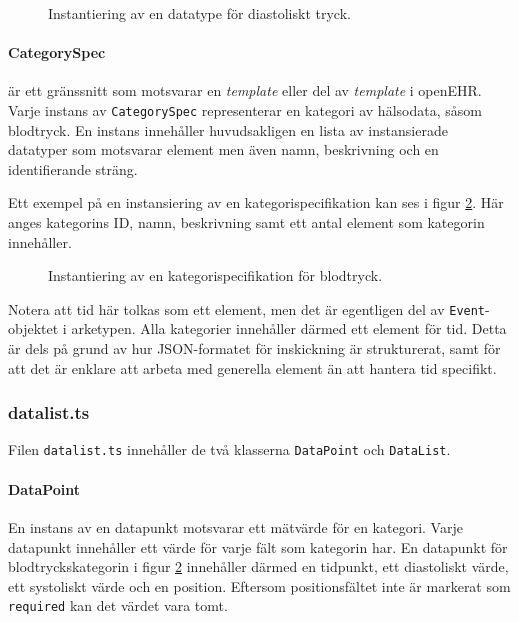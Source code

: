 \documentclass[techdoc/techdoc.tex]{subfiles}
\begin{document}
\begin{figure}[H]
    
    \caption{Instantiering av en datatype för diastoliskt tryck.}
    \label{fig:dt_diastolic}
\end{figure}

\paragraph{CategorySpec} är ett gränssnitt som motsvarar en \textit{template}
eller del av \textit{template} i openEHR. Varje instans av \texttt{CategorySpec}
representerar en kategori av hälsodata, såsom blodtryck. En instans innehåller
huvudsakligen en lista av instansierade datatyper som motsvarar element men även
namn, beskrivning och en identifierande sträng.

Ett exempel på en instansiering av en kategorispecifikation kan ses i figur
\ref{fig:spec_bp}. Här anges kategorins ID, namn, beskrivning samt ett antal
element som kategorin innehåller.

\begin{figure}[H]
    
    \caption{Instantiering av en kategorispecifikation för blodtryck.}
    \label{fig:spec_bp}
\end{figure}

Notera att tid här tolkas som ett element, men det är egentligen del av
\texttt{Event}-objektet i arketypen. Alla kategorier innehåller därmed ett
element för tid. Detta är dels på grund av hur JSON-formatet för inskickning är
strukturerat, samt för att det är enklare att arbeta med generella element än
att hantera tid specifikt.


\subsubsection{datalist.ts}
Filen \texttt{datalist.ts} innehåller de två klasserna \texttt{DataPoint} och
\texttt{DataList}.

\paragraph{DataPoint} En instans av en datapunkt motsvarar ett mätvärde för
en kategori. Varje datapunkt innehåller ett värde för varje fält som kategorin
har. En datapunkt för blodtryckskategorin i figur \ref{fig:spec_bp} innehåller
därmed en tidpunkt, ett diastoliskt värde, ett systoliskt värde och en
position. Eftersom positionsfältet inte är markerat som \texttt{required} kan
det värdet vara tomt.
\end{document}
